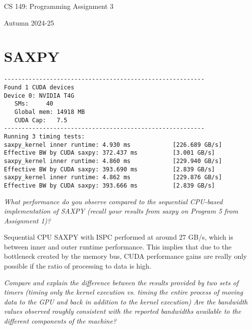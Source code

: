\documentclass[11pt]{article}
\begin{document}
\lstset{language=C++,basicstyle=\footnotesize\ttfamily,breaklines=true}

\fancyhf{}
\setlength{\headheight}{14pt}
\pagestyle{fancy}

\centerline{\Large CS 149: Programming Assignment 3}
\centerline{Autumn 2024-25}

\section{SAXPY}

\begin{lstlisting}
---------------------------------------------------------
Found 1 CUDA devices
Device 0: NVIDIA T4G
   SMs:    	40
   Global mem: 14918 MB
   CUDA Cap:   7.5
---------------------------------------------------------
Running 3 timing tests:
saxpy_kernel inner runtime: 4.930 ms        	[226.689 GB/s]
Effective BW by CUDA saxpy: 372.437 ms      	[3.001 GB/s]
saxpy_kernel inner runtime: 4.860 ms        	[229.940 GB/s]
Effective BW by CUDA saxpy: 393.690 ms      	[2.839 GB/s]
saxpy_kernel inner runtime: 4.862 ms        	[229.876 GB/s]
Effective BW by CUDA saxpy: 393.666 ms      	[2.839 GB/s]
\end{lstlisting}

\bigskip
{\it What performance do you observe compared to the sequential CPU-based
implementation of SAXPY (recall your results from saxpy on Program 5 from
Assignment 1)?}

\smallskip
Sequential CPU SAXPY with ISPC performed at around 27 GB/s, which is between
inner and outer runtime performance. This implies that due to the bottleneck
created by the memory bus, CUDA performance gains are really only possible if
the ratio of processing to data is high.

\medskip
{\it Compare and explain the difference between the results provided by two sets of timers (timing only the kernel execution vs. timing the entire process of moving data to the GPU and back in addition to the kernel execution) Are the bandwidth values observed roughly consistent with the reported bandwidths available to the different components of the machine?}
\end{document}

